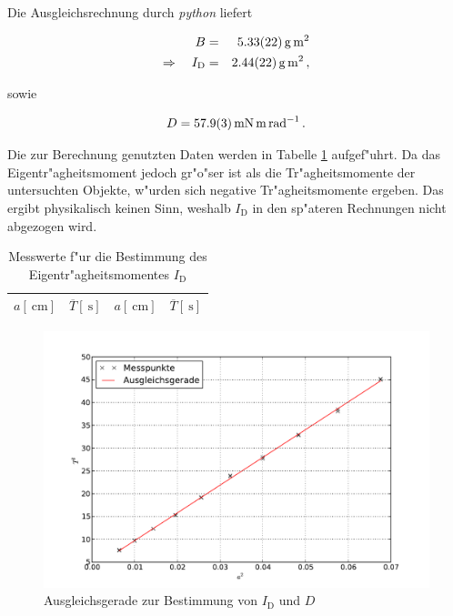 		Die Ausgleichsrechnung durch \emph{python} liefert

		\begin{eqnarray*}
			B & = & \SI{5.33 (22)}{\gram \meter \squared} \\
			\Rightarrow \quad I_\mathrm{D} & = & \SI{2.44 (22)}{\gram \meter \squared} \,,
		\end{eqnarray*}

		sowie

		\begin{equation*}
			D = \SI{57.9 (3)}{\milli \newton \meter \per \radian} \,.
		\end{equation*}

		Die zur Berechnung genutzten Daten werden in Tabelle \ref{tabelle:eigentraegheitsmoment} aufgef"uhrt.
		Da das Eigentr"agheitsmoment jedoch gr"o"ser ist als die Tr"agheitsmomente der untersuchten Objekte, w"urden sich negative Tr"agheitsmomente ergeben.
		Das ergibt physikalisch keinen Sinn, weshalb $I_\mathrm{D}$ in den sp"ateren Rechnungen nicht abgezogen wird.

		\begin{table}[h!]
			\begin{center}
				\caption{Messwerte f"ur die Bestimmung des Eigentr"agheitsmomentes $I_\mathrm{D}$ \label{tabelle:eigentraegheitsmoment}}
				\begin{tabular}{|c|c||c|c|}
					\hline
					$a [\SI{}{\centi \meter}]$ & $\overline{T} [\SI{}{\second}]$ & $a [\SI{}{\centi \meter}]$ & $\overline{T} [\SI{}{\second}]$\\
					\hline 
					\hline
					
					\hline 
				\end{tabular}
			\end{center}
		\end{table}

		\clearpage

		\begin{figure}[h!]
			\centering
			\includegraphics[width = 15cm]{img/graph2_T.pdf}
			\caption{Ausgleichsgerade zur Bestimmung von $I_\mathrm{D}$ und $D$}
			\label{fig:graph2}
		\end{figure}

